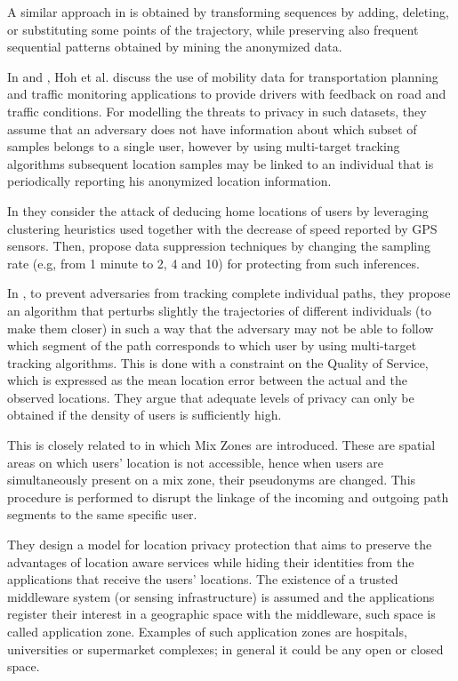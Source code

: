 \documentclass{llncs}
\begin{document}
A similar approach in \cite{Pensa2008} is obtained by transforming sequences by adding, deleting, or substituting some points of the trajectory, while preserving also frequent sequential patterns \cite{Agrawal:1995} obtained by mining the anonymized data.


In \cite{Hoh2005} and \cite{Hoh06}, Hoh et al. discuss the use of mobility data for transportation planning and traffic monitoring applications to provide drivers with feedback on road and traffic conditions.
For modelling the threats to privacy in such datasets, they assume that an adversary does not have information about which subset of samples belongs to a single user, however by using multi-target tracking algorithms \cite{Reid79analgorithm} subsequent location samples may be linked to an individual that is periodically reporting his anonymized location information.

In \cite{Hoh06} they consider the attack of deducing home locations of users by leveraging clustering heuristics used together with the decrease of speed reported by GPS sensors. Then, propose data suppression techniques by changing the sampling rate (e.g, from 1 minute to 2, 4 and 10) for protecting from such inferences.

In \cite{Hoh2005}, to prevent adversaries from tracking complete individual paths, they propose an algorithm that perturbs slightly the trajectories of different individuals (to make them closer) in such a way that the adversary may not be able to follow which segment of the path corresponds to which user by using multi-target tracking algorithms.
This is done with a constraint on the Quality of Service, which is expressed as the mean location error between the actual and the observed locations. They argue that adequate levels of privacy can only be obtained if the density of users is sufficiently high.


This is closely related to \cite{Beresford2003} in which Mix Zones are introduced. These are spatial areas on which users' location is not accessible, hence when users are simultaneously present on a mix zone, their pseudonyms are changed. This procedure is performed to disrupt the linkage of the incoming and outgoing path segments to the same specific user.

They design a model for location privacy protection that aims to preserve the advantages of location aware services while hiding their identities from the applications that receive the users' locations.
The existence of a trusted middleware system (or sensing infrastructure) is assumed and the applications register their interest in a geographic space with the middleware, such space is called application zone. Examples of such application zones are hospitals, universities or supermarket complexes; in general it could be any open or closed space.
\end{document}
